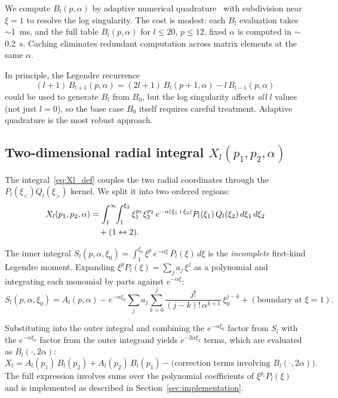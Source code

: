 \documentclass[aps,pra,twocolumn,superscriptaddress,longbibliography]{revtex4-2}
\begin{document}
We compute $B_l(p,\alpha)$ by adaptive numerical
quadrature~\cite{QUADPACK} with subdivision near $\xi = 1$
to resolve the log singularity.  The cost is modest: each
$B_l$ evaluation takes $\sim$1~ms, and the full table
$B_l(p,\alpha)$ for $l \leq 20$, $p \leq 12$, fixed $\alpha$
is computed in $\sim$0.2~s.  Caching eliminates redundant
computation across matrix elements at the same $\alpha$.

In principle, the Legendre recurrence
\begin{equation}
  (l+1)\,B_{l+1}(p,\alpha) = (2l+1)\,B_l(p+1,\alpha) - l\,B_{l-1}(p,\alpha)
  \label{eq:Bl_recurrence}
\end{equation}
could be used to generate $B_l$ from $B_0$, but the
log singularity affects \emph{all} $l$ values (not just
$l = 0$), so the base case $B_0$ itself requires careful
treatment.  Adaptive quadrature is the most robust approach.

\subsection{Two-dimensional radial integral
\texorpdfstring{$X_l(p_1, p_2, \alpha)$}{Xl(p1, p2, alpha)}}

The integral~\eqref{eq:Xl_def} couples the two radial
coordinates through the $P_l(\xi_<) Q_l(\xi_>)$ kernel.
We split it into two ordered regions:
\begin{align}
  X_l(p_1, p_2, \alpha) &=
    \int_1^\infty\!\!\int_1^{\xi_2}
      \xi_1^{p_1}\xi_2^{p_2}\,e^{-\alpha(\xi_1+\xi_2)}
      P_l(\xi_1)\,Q_l(\xi_2)\,d\xi_1\,d\xi_2 \notag\\
    &\quad+ (1 \leftrightarrow 2).
  \label{eq:Xl_split}
\end{align}

The inner integral
$S_l(p,\alpha,\xi_0) = \int_1^{\xi_0}\xi^p\,e^{-\alpha\xi}\,
P_l(\xi)\,d\xi$
is the \emph{incomplete} first-kind Legendre moment.  Expanding
$\xi^p P_l(\xi) = \sum_j a_j\,\xi^j$ as a polynomial and
integrating each monomial by parts against $e^{-\alpha\xi}$:
\begin{equation}
  S_l(p,\alpha,\xi_0) = A_l(p,\alpha) - e^{-\alpha\xi_0}
  \sum_j a_j\sum_{k=0}^{j}\frac{j!}{(j-k)!\,\alpha^{k+1}}
  \,\xi_0^{j-k}
  + (\text{boundary at }\xi=1).
  \label{eq:ibp}
\end{equation}

Substituting into the outer integral and combining the
$e^{-\alpha\xi_0}$ factor from $S_l$ with the
$e^{-\alpha\xi_2}$ factor from the outer integrand yields
$e^{-2\alpha\xi_2}$ terms, which are evaluated as
$B_l(\cdot, 2\alpha)$:
\begin{equation}
  X_l = A_l(p_1)\,B_l(p_2) + A_l(p_2)\,B_l(p_1)
  - \text{(correction terms involving }B_l(\cdot, 2\alpha)\text{)}.
  \label{eq:Xl_formula}
\end{equation}
The full expression involves sums over the polynomial
coefficients of $\xi^{p_i} P_l(\xi)$ and is implemented
as described in Section~\ref{sec:implementation}.
\end{document}
